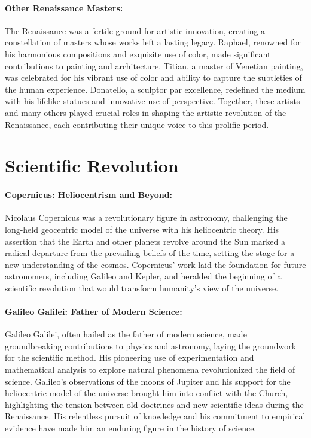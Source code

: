 \documentclass[a4paper,12pt]{book}
\begin{document}
\paragraph{Other Renaissance Masters:}
The Renaissance was a fertile ground for artistic innovation, creating a constellation of masters whose works left a lasting legacy. Raphael, renowned for his harmonious compositions and exquisite use of color, made significant contributions to painting and architecture. Titian, a master of Venetian painting, was celebrated for his vibrant use of color and ability to capture the subtleties of the human experience. Donatello, a sculptor par excellence, redefined the medium with his lifelike statues and innovative use of perspective. Together, these artists and many others played crucial roles in shaping the artistic revolution of the Renaissance, each contributing their unique voice to this prolific period.

\section*{Scientific Revolution}

\paragraph{Copernicus: Heliocentrism and Beyond:}
Nicolaus Copernicus was a revolutionary figure in astronomy, challenging the long-held geocentric model of the universe with his heliocentric theory. His assertion that the Earth and other planets revolve around the Sun marked a radical departure from the prevailing beliefs of the time, setting the stage for a new understanding of the cosmos. Copernicus’ work laid the foundation for future astronomers, including Galileo and Kepler, and heralded the beginning of a scientific revolution that would transform humanity’s view of the universe.

\paragraph{Galileo Galilei: Father of Modern Science:}
Galileo Galilei, often hailed as the father of modern science, made groundbreaking contributions to physics and astronomy, laying the groundwork for the scientific method. His pioneering use of experimentation and mathematical analysis to explore natural phenomena revolutionized the field of science. Galileo’s observations of the moons of Jupiter and his support for the heliocentric model of the universe brought him into conflict with the Church, highlighting the tension between old doctrines and new scientific ideas during the Renaissance. His relentless pursuit of knowledge and his commitment to empirical evidence have made him an enduring figure in the history of science.
\end{document}
